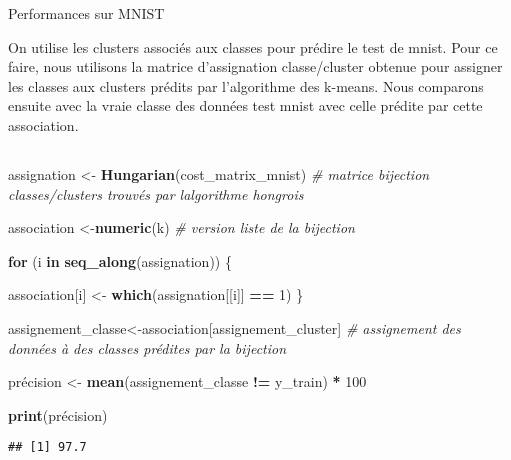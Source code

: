 \documentclass[
]{article}
\newenvironment{Shaded}{\begin{snugshade}}{\end{snugshade}}
\newcommand{\CommentTok}[1]{\textcolor[rgb]{0.56,0.35,0.01}{\textit{#1}}}
\newcommand{\ControlFlowTok}[1]{\textcolor[rgb]{0.13,0.29,0.53}{\textbf{#1}}}
\newcommand{\DecValTok}[1]{\textcolor[rgb]{0.00,0.00,0.81}{#1}}
\newcommand{\FunctionTok}[1]{\textcolor[rgb]{0.13,0.29,0.53}{\textbf{#1}}}
\newcommand{\NormalTok}[1]{#1}
\newcommand{\OtherTok}[1]{\textcolor[rgb]{0.56,0.35,0.01}{#1}}
\newcommand{\SpecialCharTok}[1]{\textcolor[rgb]{0.81,0.36,0.00}{\textbf{#1}}}
\begin{document}
Performances sur MNIST

On utilise les clusters associés aux classes pour prédire le test de
mnist. Pour ce faire, nous utilisons la matrice d'assignation
classe/cluster obtenue pour assigner les classes aux clusters prédits
par l'algorithme des k-means. Nous comparons ensuite avec la vraie
classe des données test mnist avec celle prédite par cette association.

\hypertarget{section-17}{%
\subsection{}\label{section-17}}

\begin{Shaded}
\begin{Highlighting}[]
\NormalTok{assignation }\OtherTok{\textless{}{-}} \FunctionTok{Hungarian}\NormalTok{(cost\_matrix\_mnist) }\CommentTok{\# matrice bijection classes/clusters trouvés par l\textquotesingle{}algorithme hongrois}

\NormalTok{association }\OtherTok{\textless{}{-}}\FunctionTok{numeric}\NormalTok{(k) }\CommentTok{\# version liste de la bijection}

\ControlFlowTok{for}\NormalTok{ (i }\ControlFlowTok{in} \FunctionTok{seq\_along}\NormalTok{(assignation)) \{}
  
\NormalTok{  association[i] }\OtherTok{\textless{}{-}} \FunctionTok{which}\NormalTok{(assignation[[i]] }\SpecialCharTok{==} \DecValTok{1}\NormalTok{)}
\NormalTok{\}}

\NormalTok{assignement\_classe}\OtherTok{\textless{}{-}}\NormalTok{association[assignement\_cluster] }\CommentTok{\# assignement des données à des classes prédites par la bijection}

\NormalTok{précision }\OtherTok{\textless{}{-}} \FunctionTok{mean}\NormalTok{(assignement\_classe }\SpecialCharTok{!=}\NormalTok{ y\_train) }\SpecialCharTok{*} \DecValTok{100} 

\FunctionTok{print}\NormalTok{(précision)}
\end{Highlighting}
\end{Shaded}

\begin{verbatim}
## [1] 97.7
\end{verbatim}

\hypertarget{section-18}{%
\subsection{}\label{section-18}}
\end{document}
